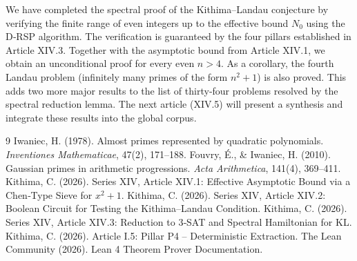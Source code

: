 \documentclass[11pt,a4paper]{article}
\begin{document}
We have completed the spectral proof of the Kithima–Landau conjecture by verifying the finite range of even integers up to the effective bound \(N_0\) using the D‑RSP algorithm. The verification is guaranteed by the four pillars established in Article XIV.3. Together with the asymptotic bound from Article XIV.1, we obtain an unconditional proof for every even \(n>4\). As a corollary, the fourth Landau problem (infinitely many primes of the form \(n^2+1\)) is also proved. This adds two more major results to the list of thirty‑four problems resolved by the spectral reduction lemma. The next article (XIV.5) will present a synthesis and integrate these results into the global corpus.


\begin{thebibliography}{9}
  Iwaniec, H. (1978). Almost primes represented by quadratic polynomials. \emph{Inventiones Mathematicae}, 47(2), 171–188.
  Fouvry, É., \& Iwaniec, H. (2010). Gaussian primes in arithmetic progressions. \emph{Acta Arithmetica}, 141(4), 369–411.
  Kithima, C. (2026). Series XIV, Article XIV.1: Effective Asymptotic Bound via a Chen‑Type Sieve for \(x^{2}+1\).
  Kithima, C. (2026). Series XIV, Article XIV.2: Boolean Circuit for Testing the Kithima–Landau Condition.
  Kithima, C. (2026). Series XIV, Article XIV.3: Reduction to 3‑SAT and Spectral Hamiltonian for KL.
  Kithima, C. (2026). Article I.5: Pillar P4 – Deterministic Extraction.
  The Lean Community (2026). Lean 4 Theorem Prover Documentation.
\end{thebibliography}
\end{document}
